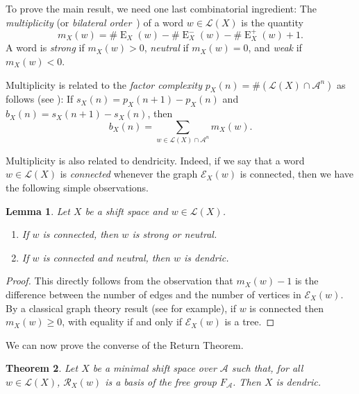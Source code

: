\documentclass{amsart}
\newcommand*{\ret}{\mathcal{R}}
\newcommand*{\lang}{\mathcal{L}}
\newcommand*{\cA}{\mathcal{A}}
\newcommand*{\Ext}{\operatorname{E}}
\newcommand*{\LExt}{\operatorname{E}^-}
\newcommand*{\RExt}{\operatorname{E}^+}
\newcommand*{\ExtGraph}{\mathcal{E}}
\newcommand*{\card}{\#}
\theoremstyle{plain}
\newtheorem{theorem}{Theorem}
\newtheorem{lemma}[theorem]{Lemma}
\theoremstyle{definition}
\theoremstyle{remark}
\begin{document}
To prove the main result, we need one last combinatorial ingredient: The \emph{multiplicity} (or \emph{bilateral order}~\cite{Balkova2008,Cassaigne1997}) of a word $w\in\lang(X)$ is the quantity
\begin{equation*}
    m_X(w) = \card \Ext_X(w) - \card \LExt_X(w) - \card \RExt_X(w) + 1.
\end{equation*}
A word is \emph{strong} if $m_X(w)>0$, \emph{neutral} if $m_X(w)=0$, and \emph{weak} if $m_X(w)<0$.

Multiplicity is related to the \emph{factor complexity} $p_X(n) = \card \left(\lang(X) \cap \cA^n\right)$ as follows (see \cite[Proposition 3.5]{Cassaigne1997}): If $s_X(n) = p_X(n+1)-p_X(n)$ and $b_X(n) = s_X(n+1)-s_X(n)$, then
\begin{equation}\label{Eq:second diff of complexity}
    b_X(n) = \sum_{w\in \lang(X)\cap \cA^n}m_X(w).
\end{equation}

Multiplicity is also related to dendricity. Indeed, if we say that a word $w \in \lang(X)$ is \emph{connected} whenever the graph $\ExtGraph_X(w)$ is connected, then we have the following simple observations.

\begin{lemma}\label{L:connected and neutral}
    Let $X$ be a shift space and $w \in \lang(X)$.
    \begin{enumerate}
        \item If $w$ is connected, then $w$ is strong or neutral.
        \item If $w$ is connected and neutral, then $w$ is dendric.
    \end{enumerate}
\end{lemma}

\begin{proof}
    This directly follows from the observation that $m_X(w) - 1$ is the difference between the number of edges and the number of vertices in $\ExtGraph_X(w)$. By a classical graph theory result (see \cite[Exercise 2.1.5 and Corollary 2.4.2]{book/Bondy1976} for example), if $w$ is connected then $m_X(w) \geq 0$, with equality if and only if $\ExtGraph_X(w)$ is a tree.
\end{proof}

We can now prove the converse of the Return Theorem.

\begin{theorem}\label{t:main}
    Let $X$ be a minimal shift space over $\cA$ such that, for all $w\in \lang(X)$, $\ret_X(w)$ is a basis of the free group $F_\cA$. Then $X$ is dendric.
\end{theorem}
\end{document}
